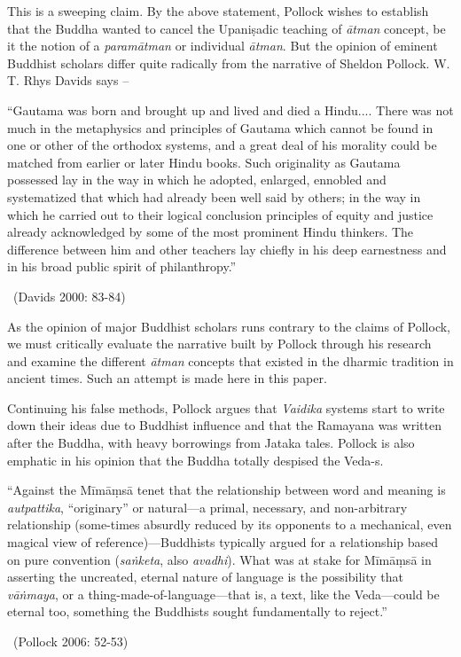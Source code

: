 This is a sweeping claim. By the above statement, Pollock wishes to establish that the Buddha wanted to cancel the Upaniṣadic teaching of \textit{ātman} concept, be it the notion of a \textit{paramātman} or individual \textit{ātman}. But the opinion of eminent Buddhist scholars differ quite radically from the narrative of Sheldon Pollock. W. T. Rhys Davids says –

\begin{myquote}
“Gautama was born and brought up and lived and died a Hindu.... There was not much in the metaphysics and principles of Gautama which cannot be found in one or other of the orthodox systems, and a great deal of his morality could be matched from earlier or later Hindu books. Such originality as Gautama possessed lay in the way in which he adopted, enlarged, ennobled and systematized that which had already been well said by others; in the way in which he carried out to their logical conclusion principles of equity and justice already acknowledged by some of the most prominent Hindu thinkers. The difference between him and other teachers lay chiefly in his deep earnestness and in his broad public spirit of philanthropy.” 

~\hfill (Davids 2000: 83-84)
\end{myquote}

As the opinion of major Buddhist scholars runs contrary to the claims of Pollock, we must critically evaluate the narrative built by Pollock through his research and examine the different \textit{ātman} concepts that existed in the dharmic tradition in ancient times. Such an attempt is made here in this paper.

Continuing his false methods, Pollock argues that \textit{Vaidika} systems start to write down their ideas due to Buddhist influence and that the Ramayana was written after the Buddha, with heavy borrowings from Jataka tales. Pollock is also emphatic in his opinion that the Buddha totally despised the Veda-s.

\begin{myquote}
“Against the Mīmāṃsā tenet that the relationship between word and meaning is \textit{autpattika}, “originary” or natural—a primal, necessary, and non-arbitrary relationship (some-times absurdly reduced by its opponents to a mechanical, even magical view of reference)—Buddhists typically argued for a relationship based on pure convention (\textit{saṅketa}, also \textit{avadhi}). What was at stake for Mīmāṃsā in asserting the uncreated, eternal nature of language is the possibility that \textit{vāṅmaya}, or a thing-made-of-language—that is, a text, like the Veda—could be eternal too, something the Buddhists sought fundamentally to reject.” 

~\hfill (Pollock 2006: 52-53)
\end{myquote}

